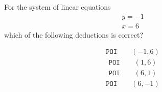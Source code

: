\documentclass{webquiz}
\begin{document}
\begin{question} %
For the system of linear equations
\begin{gather*}
y=-1\\
x=6
\end{gather*}
which of the following deductions is correct?
\begin{choice}[columns=1] %
\incorrect
\begin{gather*} 
\texttt{POI} \qquad (-1,6)
\end{gather*}
\incorrect
\begin{gather*} 
\texttt{POI} \qquad (1,6)
\end{gather*}
\incorrect
\begin{gather*} 
\texttt{POI} \qquad (6,1)
\end{gather*}
\correct
\begin{gather*} 
\texttt{POI} \qquad (6,-1)
\end{gather*}
\end{choice}
\end{question}
\end{document}
